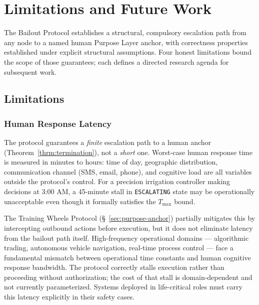 \section{Limitations and Future Work}
\label{sec:limitations-and-future-work}

The Bailout Protocol establishes a structural, compulsory escalation path from any node to a named human Purpose Layer anchor, with correctness properties established under explicit structural assumptions. Four honest limitations bound the scope of those guarantees; each defines a directed research agenda for subsequent work.

\subsection{Limitations}
\label{sec:limitations}

\subsubsection{Human Response Latency}
\label{sec:limitations-latency}

The protocol guarantees a \emph{finite} escalation path to a human anchor (Theorem~\ref{thrm:termination}), not a \emph{short} one. Worst-case human response time is measured in minutes to hours: time of day, geographic distribution, communication channel (SMS, email, phone), and cognitive load are all variables outside the protocol's control. For a precision irrigation controller making decisions at 3:00 AM, a 45-minute stall in \texttt{ESCALATING} state may be operationally unacceptable even though it formally satisfies the $T_{\max}$ bound.

The Training Wheels Protocol (\S~\ref{sec:purpose-anchor}) partially mitigates this by intercepting outbound actions before execution, but it does not eliminate latency from the bailout path itself. High-frequency operational domains --- algorithmic trading, autonomous vehicle navigation, real-time process control --- face a fundamental mismatch between operational time constants and human cognitive response bandwidth. The protocol correctly stalls execution rather than proceeding without authorization; the cost of that stall is domain-dependent and not currently parameterized. Systems deployed in life-critical roles must carry this latency explicitly in their safety cases.

